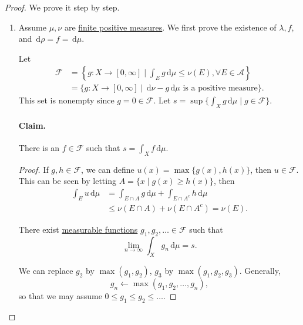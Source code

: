 \begin{proof}
	We prove it step by step.
	\begin{enumerate}
		\item Assume \(\mu, \nu\) are \hyperref[def:finite-signed-measure]{finite positive measures}. We first prove the existence of \(\lambda , f\),
		      and \(\,\mathrm{d} \rho = f = \,\mathrm{d} \mu \).

		      Let
		      \[
			      \begin{split}
				      \mathscr{F} & = \left\{g \colon X \to [0,\infty] \mid \int_E g \,\mathrm{d} \mu \leq \nu(E), \forall E \in \mathcal{A}\right\} \\
				      & = \{g \colon X \to [0,\infty] \mid \,\mathrm{d} \nu - g\,\mathrm{d} \mu \text{ is a positive measure}\}.
			      \end{split}
		      \]
		      This set is nonempty since \(g = 0 \in \mathscr{F}\). Let \(s = \sup\{\int_X g \,\mathrm{d} \mu \mid g \in \mathscr{F}\}\).

		      \paragraph{Claim.} There is an \(f \in \mathscr{F}\) such that \(s = \int_X f \,\mathrm{d} \mu\).
		      \begin{mdframed}[skipabove=0.1in,skipbelow=0.1in]
			      \begin{proof}
				      If \(g, h \in \mathscr{F}\), we can define \(u(x) = \max\{g(x),h(x)\}\), then \(u \in \mathscr{F}\). This can be seen by letting
				      \(A = \{x \mid g(x) \geq h(x)\}\), then
				      \[
					      \begin{split}
						      \int_E u \,\mathrm{d} \mu & = \int_{E \cap A} g \,\mathrm{d} \mu + \int_{E \cap A^c} h \,\mathrm{d} \mu \\
						      & \leq \nu(E \cap A) + \nu(E \cap A^c) = \nu(E).
					      \end{split}
				      \]

				      There exist \hyperref[def:measurable-function]{measurable functions} \(g_1,g_2,\ldots \in \mathscr{F}\) such that
				      \[
					      \lim_{n \to \infty} \int_X g_n \,\mathrm{d} \mu = s.
				      \]

				      We can replace \(g_2\) by \(\max(g_1,g_2)\), \(g_3\) by \(\max(g_1,g_2,g_3)\). Generally,
				      \[
					      g_{n} \gets \mathop{\max} (g_1, g_2, \ldots , g_n),
				      \]
				      so that we may assume \(0 \leq g_1 \leq g_2 \leq \ldots\).


\end{proof}
\end{mdframed}
\end{enumerate}
\end{proof}
